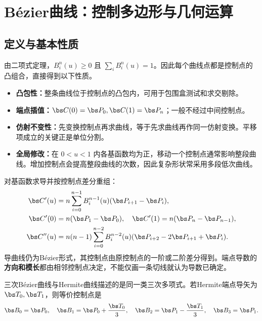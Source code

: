 
\section{Bézier曲线：控制多边形与几何运算}

\subsection{定义与基本性质}

由二项式定理，$B_i^n(u)\geq0$ 且 $\sum_iB_i^n(u)=1$。因此每个曲线点都是控制点的凸组合，直接得到以下性质。
\begin{itemize}
 \item \textbf{凸包性：}整条曲线位于控制点的凸包内，可用于包围盒测试和求交剔除。
 \item \textbf{端点插值：}$\bs C(0)=\bs P_0,\bs C(1)=\bs P_n$；一般不经过中间控制点。
 \item \textbf{仿射不变性：}先变换控制点再求曲线，等于先求曲线再作同一仿射变换。平移项成立的关键正是单位分割。
 \item \textbf{全局修改：}在 $0<u<1$ 内各基函数均为正，移动一个控制点通常影响整段曲线。增加控制点会提高整段曲线的次数，因此复杂形状常采用多段低次曲线。
\end{itemize}

对基函数求导并按控制点差分重组：
\begin{align*}
 \bs C'(u)&=n\sum_{i=0}^{n-1}B_i^{n-1}(u)(\bs P_{i+1}-\bs P_i),\\
 \bs C'(0)&=n(\bs P_1-\bs P_0),\quad
 \bs C'(1)=n(\bs P_n-\bs P_{n-1}),\\
 \bs C''(u)&=n(n-1)\sum_{i=0}^{n-2}B_i^{n-2}(u)
 (\bs P_{i+2}-2\bs P_{i+1}+\bs P_i).
\end{align*}
导曲线仍为Bézier形式，其控制点由原控制点的一阶或二阶差分得到。端点导数的\textbf{方向和模长}都由相邻控制点决定，不能仅画一条切线就认为导数已确定。

三次Bézier曲线与Hermite曲线描述的是同一类三次多项式。若Hermite端点导矢为 $\bs T_0,\bs T_1$，则等价控制点是
\[
 \bs B_0=\bs P_0,\quad \bs B_1=\bs P_0+\frac{\bs T_0}{3},\quad
 \bs B_2=\bs P_1-\frac{\bs T_1}{3},\quad\bs B_3=\bs P_1.
\]

